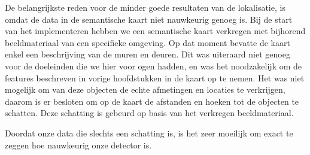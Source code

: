 De belangrijkste reden voor de minder goede resultaten van de lokalisatie, is omdat de data in de semantische kaart niet nauwkeurig genoeg is.
Bij de start van het implementeren hebben we een semantische kaart verkregen met bijhorend beeldmateriaal van een specifieke omgeving.
Op dat moment bevatte de kaart enkel een beschrijving van de muren en deuren.
Dit was uiteraard niet genoeg voor de doeleinden die we hier voor ogen hadden, en was het noodzakelijk om de features beschreven in vorige hoofdstukken
in de kaart op te nemen.
Het was niet mogelijk om van deze objecten de echte afmetingen en locaties te verkrijgen, daarom is er besloten om op de kaart de afstanden en hoeken tot de objecten
te schatten. Deze schatting is gebeurd op basis van het verkregen beeldmateriaal.

Doordat onze data die slechts een schatting is, is het zeer moeilijk om exact te zeggen hoe nauwkeurig onze detector is.